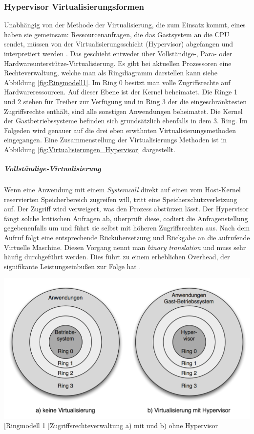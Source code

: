 \subsubsection{Hypervisor Virtualisierungsformen}
Unabhängig von der Methode der Virtualisierung, die zum Einsatz kommt, eines haben sie gemeinsam: Ressourcenanfragen, die das Gastsystem an die CPU sendet, müssen von der Virtualisierungsschicht (Hypervisor) abgefangen und interpretiert werden \cite{Meinel2011VirtualisierungMarktubersicht}. Das geschieht entweder über Vollständige-, Para- oder Hardwareunterstütze-Virtualisierung.  Es gibt bei aktuellen Prozessoren eine Rechteverwaltung, welche man als Ringdiagramm darstellen kann siehe Abbildung \ref{fig:Ringmodell1}. Im Ring 0 besitzt man volle Zugriffsrechte auf Hardwareressourcen. Auf dieser Ebene ist der Kernel beheimatet. Die Ringe 1 und 2 stehen für Treiber zur Verfügung und in Ring 3 der die eingeschränktesten Zugriffsrechte enthält, sind alle sonstigen Anwendungen beheimatet. Die Kernel der Gastbetriebssysteme befinden sich grundsätzlich ebenfalls in dem 3. Ring. Im Folgeden wird genauer auf die drei eben erwähnten Virtualisierungsmethoden eingegangen. Eine Zusammenstellung der Virtualisierungs Methoden ist in Abbildung \ref{fig:Virtualisierungen_Hypervisor} dargestellt.

\subparagraph{Vollständige-Virtualisierung}
 Wenn eine Anwendung mit einem \emph{Systemcall} direkt auf einen vom Host-Kernel reservierten Speicherbereich zugreifen will, tritt eine Speicherschutzverletzung auf. Der Zugriff wird verweigert, was den Prozess abstürzen lässt. Der Hypervisor fängt solche kritischen Anfragen ab, überprüft diese, codiert die Anfragenstellung gegebenenfalls um und führt sie selbst mit höheren Zugriffsrechten aus. Nach dem Aufruf folgt eine entsprechende Rückübersetzung und Rückgabe an die aufrufende Virtuelle Maschine. Diesen Vorgang nennt man \emph{binary translation} und muss sehr häufig durchgeführt werden. Dies führt zu einem erheblichen Overhead, der signifikante Leistungseinbußen zur Folge hat \cite{Meinel2011VirtualisierungMarktubersicht}. 
 
 \vspace{1em}
\begin{minipage}{\linewidth}
	\centering
	\includegraphics[width=1\linewidth]{pics/Ringmodell1.PNG}
	[Ringmodell 1 ]{Zugriffsrechteverwaltung a) mit und b) ohne Hypervisor \cite{Meinel2011VirtualisierungMarktubersicht} }
	\label{fig:Ringmodell1}
\end{minipage}
 
